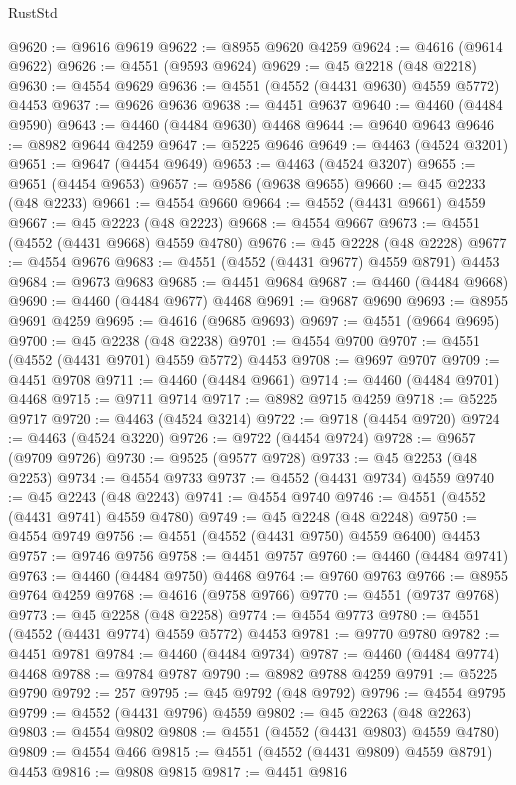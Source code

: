 \begin{lexlean}{RustStd}
\begin{coremodule}
@9620 := @9616 @9619
@9622 := @8955 @9620 @4259
@9624 := @4616 (@9614 @9622)
@9626 := @4551 (@9593 @9624)
@9629 := @45 @2218 (@48 @2218)
@9630 := @4554 @9629
@9636 := @4551 (@4552 (@4431 @9630) @4559 @5772) @4453
@9637 := @9626 @9636
@9638 := @4451 @9637
@9640 := @4460 (@4484 @9590)
@9643 := @4460 (@4484 @9630) @4468
@9644 := @9640 @9643
@9646 := @8982 @9644 @4259
@9647 := @5225 @9646
@9649 := @4463 (@4524 @3201)
@9651 := @9647 (@4454 @9649)
@9653 := @4463 (@4524 @3207)
@9655 := @9651 (@4454 @9653)
@9657 := @9586 (@9638 @9655)
@9660 := @45 @2233 (@48 @2233)
@9661 := @4554 @9660
@9664 := @4552 (@4431 @9661) @4559
@9667 := @45 @2223 (@48 @2223)
@9668 := @4554 @9667
@9673 := @4551 (@4552 (@4431 @9668) @4559 @4780)
@9676 := @45 @2228 (@48 @2228)
@9677 := @4554 @9676
@9683 := @4551 (@4552 (@4431 @9677) @4559 @8791) @4453
@9684 := @9673 @9683
@9685 := @4451 @9684
@9687 := @4460 (@4484 @9668)
@9690 := @4460 (@4484 @9677) @4468
@9691 := @9687 @9690
@9693 := @8955 @9691 @4259
@9695 := @4616 (@9685 @9693)
@9697 := @4551 (@9664 @9695)
@9700 := @45 @2238 (@48 @2238)
@9701 := @4554 @9700
@9707 := @4551 (@4552 (@4431 @9701) @4559 @5772) @4453
@9708 := @9697 @9707
@9709 := @4451 @9708
@9711 := @4460 (@4484 @9661)
@9714 := @4460 (@4484 @9701) @4468
@9715 := @9711 @9714
@9717 := @8982 @9715 @4259
@9718 := @5225 @9717
@9720 := @4463 (@4524 @3214)
@9722 := @9718 (@4454 @9720)
@9724 := @4463 (@4524 @3220)
@9726 := @9722 (@4454 @9724)
@9728 := @9657 (@9709 @9726)
@9730 := @9525 (@9577 @9728)
@9733 := @45 @2253 (@48 @2253)
@9734 := @4554 @9733
@9737 := @4552 (@4431 @9734) @4559
@9740 := @45 @2243 (@48 @2243)
@9741 := @4554 @9740
@9746 := @4551 (@4552 (@4431 @9741) @4559 @4780)
@9749 := @45 @2248 (@48 @2248)
@9750 := @4554 @9749
@9756 := @4551 (@4552 (@4431 @9750) @4559 @6400) @4453
@9757 := @9746 @9756
@9758 := @4451 @9757
@9760 := @4460 (@4484 @9741)
@9763 := @4460 (@4484 @9750) @4468
@9764 := @9760 @9763
@9766 := @8955 @9764 @4259
@9768 := @4616 (@9758 @9766)
@9770 := @4551 (@9737 @9768)
@9773 := @45 @2258 (@48 @2258)
@9774 := @4554 @9773
@9780 := @4551 (@4552 (@4431 @9774) @4559 @5772) @4453
@9781 := @9770 @9780
@9782 := @4451 @9781
@9784 := @4460 (@4484 @9734)
@9787 := @4460 (@4484 @9774) @4468
@9788 := @9784 @9787
@9790 := @8982 @9788 @4259
@9791 := @5225 @9790
@9792 := 257
@9795 := @45 @9792 (@48 @9792)
@9796 := @4554 @9795
@9799 := @4552 (@4431 @9796) @4559
@9802 := @45 @2263 (@48 @2263)
@9803 := @4554 @9802
@9808 := @4551 (@4552 (@4431 @9803) @4559 @4780)
@9809 := @4554 @466
@9815 := @4551 (@4552 (@4431 @9809) @4559 @8791) @4453
@9816 := @9808 @9815
@9817 := @4451 @9816

\end{coremodule}
\end{lexlean}
